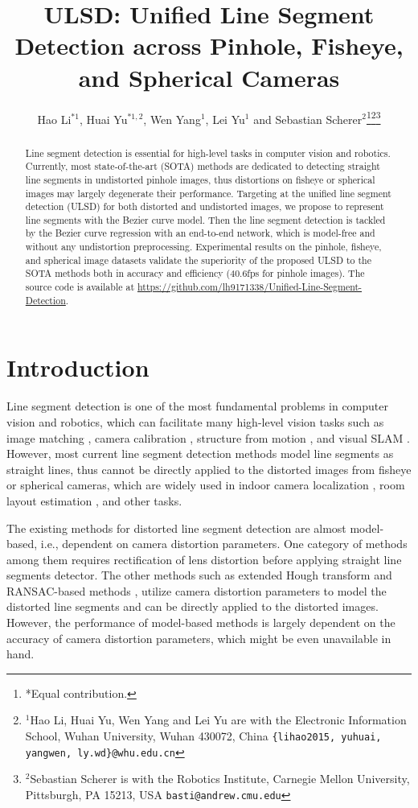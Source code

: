 \documentclass[letterpaper, 10 pt, conference]{ieeeconf}
\title{\LARGE \bf
ULSD: Unified Line Segment Detection across Pinhole, Fisheye, and Spherical Cameras
}
\author{Hao Li$^{*1}$, Huai Yu$^{*1,2}$, Wen Yang$^{1}$, Lei Yu$^{1}$ and Sebastian Scherer$^{2}$\thanks{*Equal contribution.}\thanks{$^{1}$Hao Li, Huai Yu, Wen Yang and Lei Yu are with the Electronic Information School, Wuhan University,  Wuhan 430072, China {\tt\small \{lihao2015, yuhuai, yangwen, ly.wd\}@whu.edu.cn}}\thanks{$^{2}$Sebastian Scherer is with the Robotics Institute, Carnegie Mellon University,
	Pittsburgh, PA 15213, USA
	{\tt\small basti@andrew.cmu.edu}}}
\begin{document}
\maketitle
\thispagestyle{empty}
\pagestyle{empty}


\begin{abstract}
	Line segment detection is essential for high-level tasks in computer vision and robotics. Currently, most state-of-the-art (SOTA) methods are dedicated to detecting straight line segments in undistorted pinhole images, thus distortions on fisheye or spherical images may largely degenerate their performance. Targeting at the unified line segment detection (ULSD) for both distorted and undistorted images, we propose to represent line segments with the Bezier curve model. Then the line segment detection is tackled by the Bezier curve regression with an end-to-end network, which is model-free and without any undistortion preprocessing. Experimental results on the pinhole, fisheye, and spherical image datasets validate the superiority of the proposed ULSD to the SOTA methods both in accuracy and efficiency (40.6fps for pinhole images). The source code is available at \href{https://github.com/lh9171338/Unified-Line-Segment-Detection}{https://github.com/lh9171338/Unified-Line-Segment-Detection}.  
	
\end{abstract}

\section{Introduction} \label{sec1}
Line segment detection is one of the most fundamental problems in computer vision and robotics, which can facilitate many high-level vision tasks such as image matching \cite{ImageMatching}, camera calibration \cite{FisheyeRectification3,FisheyeRectification4},  structure from motion \cite{SfM1,SfM2}, and visual SLAM \cite{StructVIO,vSLAM1,vSLAM2, yu2020IROS}. However, most current line segment detection methods model line segments as straight lines, thus cannot be directly applied to the distorted images from fisheye 
or spherical cameras, which are widely used in indoor camera localization \cite{IndoorLocalization1, IndoorLocalization2}, room layout estimation \cite{Layout1, Layout2}, and other tasks.

The existing methods for distorted line segment detection are almost model-based, i.e., dependent on camera distortion parameters. One category of methods among them requires rectification of lens distortion before applying straight line segments detector. The other methods such as extended Hough transform \cite{FisheyeRectification1} and RANSAC-based methods \cite{FisheyeRectification2}, utilize camera distortion parameters to model the distorted line segments and can be directly applied to the distorted images. However, the performance of model-based methods is largely dependent on the accuracy of camera distortion parameters, which might be even unavailable in hand.
\end{document}
